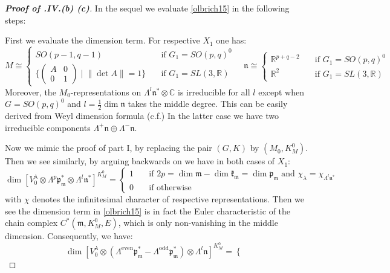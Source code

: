 \documentclass[11pt]{report}
\theoremstyle{definition}
\theoremstyle{plain}
\newcommand{\real}{\mathbb{R}}
\newcommand{\complex}{\mathbb{C}}
\newcommand{\even}{\mathrm{even}}
\newcommand{\odd}{\mathrm{odd}}
\newcommand{\norm}[1]{\lVert #1 \rVert}
\newcommand{\Lie}[1]{\mathfrak{#1}}
\begin{document}
\begin{proof}[\textbf{Proof of .IV.(b) (c)}]
In the sequel we evaluate \ref{olbrich15} in the following steps:
\par First we evaluate the dimension term. For respective $X_1$ one has:
	\begin{equation}
	M\cong\begin{cases}
	SO(p-1, q-1) \quad &\text{if $G_1=SO(p,q)^0$}\\
	\{\begin{pmatrix}
	A &0\\0 &1
	\end{pmatrix}\mid \norm{\det A}=1\} \quad &\text{if $G_1=SL(3,\real)$}
	\end{cases}\quad \Lie{n}\cong \begin{cases}
	\real^{p+q-2}\quad &\text{if $G_1=SO(p,q)^0$}\\
	\real^2 \quad &\text{if $G_1=SL(3,\real)$}
	\end{cases}
	\end{equation}
	Moreover, the $M_0$-representations on $\Lambda^l\Lie{n}^*\otimes \complex$ is irreducible for all $l$ except when $G=SO(p,q)^0$ and $l=\frac{1}{2}\dim \Lie{n}$ takes the middle degree. This can be easily derived from Weyl dimension formula (c.f.\cite[Theorem~4.48ff]{knapp2016}) In the latter case we have two irreducible components $\Lambda^+\Lie{n}\oplus \Lambda^-{\Lie{n}}$. 
	\par Now we mimic the proof of part I, by replacing the pair $(G,K)$ by $(M_0, K^0_M)$. Then we see similarly, by arguing backwards on  we have in both cases of $X_1$:
	\begin{equation}
	\dim [V^\lambda_0\otimes \Lambda^p\Lie{p}_\Lie{m}^*\otimes \Lambda^l\Lie{n}^*]^{K_M^0}=\begin{cases} 1 \quad &\text{if $2p=\dim \Lie{m}-\dim \Lie{k}_\Lie{m}=\dim \Lie{p}_\Lie{m}$ and $\chi_{\lambda}=\chi_{\Lambda^l\Lie{n}^*}$}\\ 0 \quad &\text{if otherwise} \end{cases} 
	\end{equation}
	with $\chi$ denotes the infinitesimal character of respective representations. Then we see the dimension term in \ref{olbrich15} is in fact the Euler characteristic of the chain complex $C^*(\Lie{m}, K^0_M, E)$, which is only non-vanishing in the middle dimension. Consequently, we have:
	\begin{equation}\label{olbrich b4 17}
	\dim [V^\lambda_0\otimes (\Lambda^{\even}\Lie{p}_\Lie{m}^*-\Lambda^\odd\Lie{p}_\Lie{m}^*)\otimes \Lambda^l\Lie{n}]^{K_M^0}=\begin{cases}

\end{cases}
\end{equation}
\end{proof}
\end{document}
